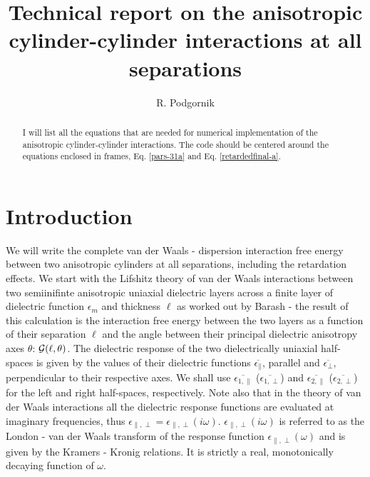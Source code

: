 \documentclass[onecolumn,letterpaper,amsmath,amssymb,floatfix,aps,superscriptaddress]{revtex4}
\begin{document}
\title{\bf Technical report on the anisotropic cylinder-cylinder interactions at all separations} 


\author{R. Podgornik}
    
\begin{abstract}
I will list all the equations that are needed for numerical implementation of the anisotropic cylinder-cylinder interactions. The code should be
centered around the equations enclosed in frames, Eq. \ref{pars-31a} and Eq. \ref{retardedfinal-a}.
\end{abstract}


\maketitle        

\section{Introduction}


We will write the complete van der Waals -  dispersion interaction free energy between two anisotropic cylinders at all separations, including the retardation effects. 
We start with the Lifshitz theory of van der Waals interactions between two semiinifinte anisotropic uniaxial dielectric layers across a finite layer of dielectric 
function $\epsilon_{m}$ and thickness $\ell$ as worked out by Barash \cite{Barash} - the result of this calculation is the interaction free energy between the two 
layers as a function of their separation $\ell$ and the angle between their principal dielectric anisotropy axes $\theta$: ${\cal G}(\ell,\theta)$. The dielectric 
response of the two dielectrically uniaxial half-spaces is given by the values of their dielectric functions $\overline{\epsilon_{\parallel}}$, parallel and 
$\overline{\epsilon_{\perp}}$, perpendicular to their respective axes.  We shall use $\overline{\epsilon_{1,\parallel}}$ ($\overline{\epsilon_{1,\perp}}$) and 
$\overline{\epsilon_{2,\parallel}}$ ($\overline{\epsilon_{2,\perp}}$) for the left and right half-spaces, respectively. Note also that in the theory of van der 
Waals interactions \cite{Parsegian,Ninham} all the dielectric response functions are evaluated at imaginary frequencies, 
thus $\epsilon_{\parallel,\perp} = \epsilon_{\parallel,\perp}(i \omega)$. $\epsilon_{\parallel,\perp}(i \omega)$ is referred to as the London - van der Waals 
transform of the response function $\epsilon_{\parallel,\perp}(\omega)$ and is given by the Kramers - Kronig relations. It is strictly a real, monotonically 
decaying function of $\omega$. 
\end{document}
